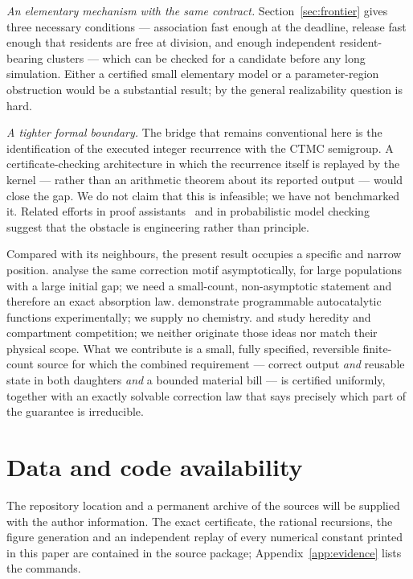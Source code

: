 \documentclass[11pt,a4paper]{article}
\newcommand{\RepositoryNote}{The repository location and a permanent archive of the
sources will be supplied with the author information.}
\theoremstyle{plain}
\theoremstyle{definition}
\theoremstyle{remark}
\begin{document}
\emph{An elementary mechanism with the same contract.} Section~\ref{sec:frontier} gives
three necessary conditions --- association fast enough at the deadline, release fast
enough that residents are free at division, and enough independent resident-bearing
clusters --- which can be checked for a candidate before any long simulation. Either a
certified small elementary model or a parameter-region obstruction would be a substantial
result; by \citet{phan2026} the general realizability question is hard.

\emph{A tighter formal boundary.} The bridge that remains conventional here is the
identification of the executed integer recurrence with the CTMC semigroup. A
certificate-checking architecture in which the recurrence itself is replayed by the kernel
--- rather than an arithmetic theorem about its reported output --- would close the gap.
We do not claim that this is infeasible; we have not benchmarked it. Related efforts in
proof assistants~\citep{lathrop2024,ripple2026,holzl2017} and in probabilistic model
checking~\citep{lakin2012,kwiatkowska2011} suggest that the obstacle is engineering rather
than principle.

Compared with its neighbours, the present result occupies a specific and narrow position.
\citet{condon2020} analyse the same correction motif asymptotically, for large populations
with a large initial gap; we need a small-count, non-asymptotic statement and therefore an
exact absorption law. \citet{kriukov2024} demonstrate programmable autocatalytic functions
experimentally; we supply no chemistry. \citet{matsubara2026} and \citet{lu2024} study
heredity and compartment competition; we neither originate those ideas nor match their
physical scope. What we contribute is a small, fully specified, reversible finite-count
source for which the combined requirement --- correct output \emph{and} reusable state in
both daughters \emph{and} a bounded material bill --- is certified uniformly, together with
an exactly solvable correction law that says precisely which part of the guarantee is
irreducible.

\section*{Data and code availability}

\RepositoryNote{} The exact certificate, the rational recursions, the figure generation
and an independent replay of every numerical constant printed in this paper are contained
in the source package; Appendix~\ref{app:evidence} lists the commands.
\end{document}
